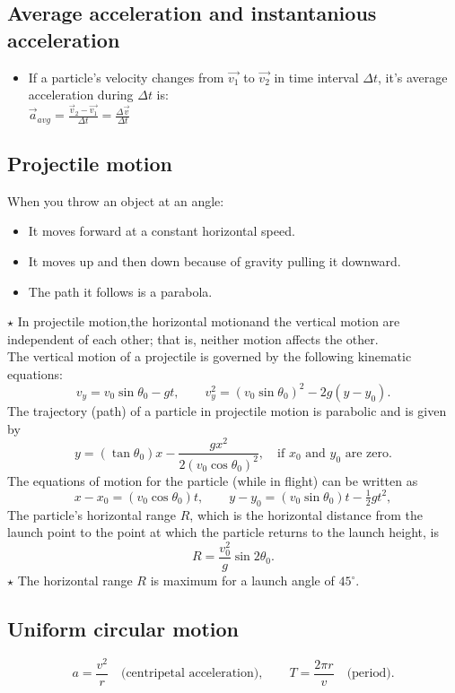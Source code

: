 \documentclass[fleqn]{article}
\begin{document}
\subsection{Average acceleration and instantanious acceleration}
\begin{itemize}
    \item If a particle's velocity changes from $\vec{v_1}$ to $\vec{v_2}$ in time interval $\Delta t$, it's average acceleration during $\Delta t$ is:\\ $\vec{a}_{avg} = \frac{\vec{v}_2 - \vec{v_1}}{\Delta t} = \frac{\Delta\vec{v}}{\Delta t}$
\end{itemize}

\subsection{Projectile motion}
When you throw an object at an angle:
\begin{itemize}
    \item It moves forward at a constant horizontal speed.
    \item It moves up and then down because of gravity pulling it downward.
    \item The path it follows is a parabola.
\end{itemize}
$\star$ In projectile motion,the horizontal motionand the vertical motion are independent of each other; that is, neither motion affects the other.\\
The vertical motion of a projectile is governed by the following kinematic equations:
\[
v_y = v_0 \sin \theta_0 - gt, \qquad
v_y^2 = (v_0 \sin \theta_0)^2 - 2g(y - y_0).
\]
The trajectory (path) of a particle in projectile motion is parabolic and is given by
\[
y = (\tan \theta_0)x - \frac{g x^2}{2 (v_0 \cos \theta_0)^2}, \quad \text{if } x_0 \text{ and } y_0 \text{ are zero.}
\]
The equations of motion for the particle (while in flight) can be written as
\[
x - x_0 = (v_0 \cos \theta_0)t, \qquad
y - y_0 = (v_0 \sin \theta_0)t - \tfrac{1}{2} g t^2,
\]
The particle's horizontal range $R$, which is the horizontal distance from the launch point to the point at which the particle returns to the launch height, is
\[
R = \frac{v_0^2}{g} \sin 2\theta_0.
\]
$\star$ The horizontal range $R$ is maximum for a launch angle of $45^\circ$.

\subsection{Uniform circular motion}
\[
a = \frac{v^2}{r} \quad \text{(centripetal acceleration)}, \qquad
T = \frac{2\pi r}{v} \quad \text{(period).}
\]
\end{document}
